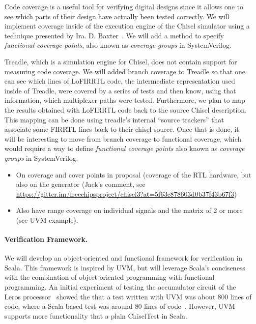 \documentclass[conference]{IEEEtran}
\begin{document}
Code coverage is a useful tool for verifying digital designs
since it allows one to see which parts of their design have actually been tested correctly. 
We will implement coverage inside of the execution engine of the Chisel simulator using a technique
presented by Ira. D. Baxter~\cite{branch-cov-made-easy:2002}.
We will add a method to specify \textit{functional coverage points}, also known as
\textit{coverage groups} in SystemVerilog.


Treadle, which is a simulation engine for Chisel, does not contain support for measuring code coverage.
We will added branch coverage to Treadle so that one can see which lines of
LoFIRRTL code, the intermediate representation used inside of Treadle, were covered by a series of tests
and then know, using that information, which multiplexer paths were tested. 
Furthermore, we plan to map the results obtained with LoFIRRTL code back to the source Chisel description.
This mapping can be done using treadle's internal ``source trackers'' that associate some FIRRTL lines back
to their chisel source. Once that is done, it will be interesting to move from branch coverage to functional
coverage, which would require a way to define \textit{functional coverage points} also known as
\textit{coverage groups} in SystemVerilog.

\begin{itemize}
\item On coverage and cover points in proposal (coverage of the RTL hardware, but also on the generator (Jack's comment, see \url{https://gitter.im/freechipsproject/chisel3?at=5f63c878603d0b37f43b67f3})
\item Also have range coverage on individual signals and the matrix of 2 or more (see UVM example).
\end{itemize}



\paragraph{Verification Framework.}

We will develop an object-oriented and functional framework for verification in Scala.
This framework is inspired by UVM, but will leverage Scala's conciseness with the
combination of object-oriented programming with functional programming.
An initial experiment of testing the accumulator circuit of the Leros processor~\cite{leros:arcs2019}
showed the that a test written with UVM was about 800 lines of code, where a Scala based
test was around 80 lines of code~\cite{verify:chisel:2020}.
However, UVM supports more functionality that a plain ChiselTest in Scala.
\end{document}
